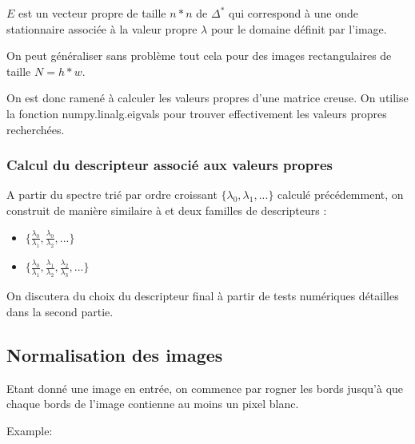 \documentclass[a4paper,10pt]{article} %
\theoremstyle{definition} %
\begin{document}
  $E$ est un vecteur propre de taille $n*n$  de $\Delta^*$ qui correspond à une onde stationnaire associée à la valeur propre $\lambda$ pour le domaine définit par l'image.
  
  On peut généraliser sans problème tout cela pour des images rectangulaires de taille $N = h*w$.
  
  On est donc ramené à calculer les valeurs propres d'une matrice creuse. On utilise la fonction numpy.linalg.eigvals pour trouver effectivement les valeurs propres recherchées.
  
  
  \subsubsection*{Calcul du descripteur associé aux valeurs propres}


A partir du spectre trié par ordre croissant $\{\lambda_0, \lambda_1, ...\}$ calculé précédemment, on construit de manière similaire à \cite{Zuliani04} et \cite{KhabouHR07} deux familles de descripteurs : 
\begin{itemize}
\item $\{\frac{\lambda_0}{\lambda_1}, \frac{\lambda_0}{\lambda_2}, ... \}$
\item $\{\frac{\lambda_0}{\lambda_1}, \frac{\lambda_1}{\lambda_2}, \frac{\lambda_2}{\lambda_3},...\}$
\end{itemize}

On discutera du choix du descripteur final à partir de tests numériques détailles dans la second partie.
  
\subsection{Normalisation des images}

Etant donné une image en entrée, on commence par rogner les bords jusqu'à que chaque bords de l'image contienne au moins un pixel blanc.

Example:
\end{document}
